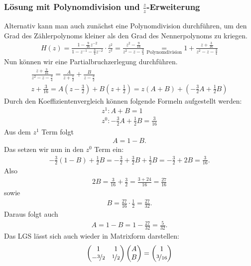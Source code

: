 \documentclass[11pt,a4paper,DIV=12]{scrartcl}
\begin{document}
\subsubsection{Lösung mit Polynomdivision und $\frac{z}{z}$-Erweiterung}
%
Alternativ kann man auch zunächst eine Polynomdivision durchführen,
um den Grad des Zählerpolynoms kleiner als den Grad des Nennerpolynoms
zu kriegen.
%
\begin{gather}
	H(z)=
	\frac{1-\frac{9}{16}z^{-2}}{1-z^{-1}-\frac{3}{4}z^{-2}}\cdot\frac{z^2}{z^2}
	=\frac{z^2-\frac{9}{16}}{z^2-z-\frac{3}{4}}
	\underset{\text{Polynomdivision}}{=}1+\frac{z+\frac{3}{16}}{z^2-z-\frac{3}{4}}
\end{gather}
%
Nun können wir eine Partialbruchzerlegung durchführen.
%
\begin{gather}
	\frac{z+\frac{3}{16}}{z^2-z-\frac{3}{4}}=\frac{A}{z+\frac{1}{2}}+\frac{B}{z-\frac{3}{2}}\\
	z+\frac{3}{16}=A\left(z-\frac{3}{2}\right)+B\left(z+\frac{1}{2}\right)=z\left(A+B\right)+\left(-\frac{3}{2}A+\frac{1}{2}B\right)
\end{gather}
%
Durch den Koeffizientenvergleich können folgende Formeln aufgestellt werden:
%
\begin{gather}
	z^1: A+B=1\\
	z^0: -\frac{3}{2}A+\frac{1}{2}B=\frac{3}{16}
\end{gather}
%
Aus dem $z^1$ Term folgt
%
\begin{gather}
	A=1-B.
\end{gather}
%
Das setzen wir nun in den $z^0$ Term ein:
%
\begin{gather}
	-\frac{3}{2}(1-B)+\frac{1}{2}B=-\frac{3}{2}+\frac{3}{2}B+\frac{1}{2}B=-\frac{3}{2}+2B=\frac{3}{16}.
\end{gather}
%
Also
%
\begin{gather}
	2B=\frac{3}{16}+\frac{3}{2}=\frac{3+24}{16}=\frac{27}{16}
\end{gather}
%
sowie
%
\begin{gather}
	B=\frac{27}{16}\cdot\frac{1}{2}=\frac{27}{32}.
\end{gather}
%
Daraus folgt auch
%
\begin{gather}
	A=1-B=1-\frac{27}{32}=\frac{5}{32}.
\end{gather}
%
Das LGS lässt sich auch wieder in Matrixform darstellen:
%
\begin{gather}
	\begin{pmatrix}
		1 & 1\\
		-\nicefrac{3}{2} & \nicefrac{1}{2}
	\end{pmatrix}
	\begin{pmatrix}
		A \\
		B
	\end{pmatrix}
	=
	\begin{pmatrix}
		1 \\
		\nicefrac{3}{16}
	\end{pmatrix}
\end{gather}
\end{document}

